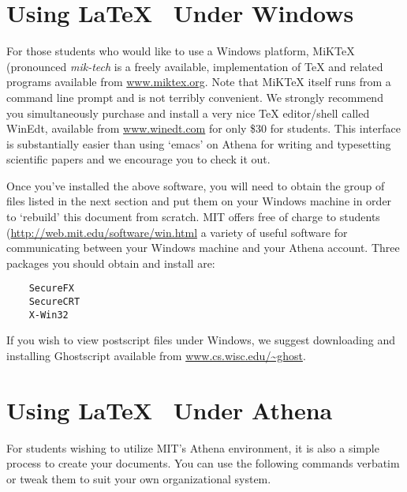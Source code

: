     \clearpage
    \appendix
    
    
    
    \section{Using \LaTeX~ Under Windows}
    For those students who would like to use a Windows platform, MiKTeX
    (pronounced \emph{mik-tech} is a freely available, implementation of
    TeX and related programs available from \url{www.miktex.org}. Note
    that MiKTeX itself runs from a command line prompt and is not terribly
    convenient.  We strongly recommend you simultaneously purchase and
    install a very nice TeX editor/shell called WinEdt, available from
    \url{www.winedt.com} for only \$30 for students. This interface is
    substantially easier than using `emacs' on Athena for writing and
    typesetting scientific papers and we encourage you to check it out.
    
    Once you've installed the above software, you will need to obtain the
    group of files listed in the next section and put them on your Windows
    machine in order to `rebuild' this document from scratch.  MIT offers
    free of charge to students (\url{http://web.mit.edu/software/win.html}
    a variety of useful software for communicating between your Windows
    machine and your Athena account.  Three packages you should obtain and
    install are:
    \begin{verbatim}
    SecureFX
    SecureCRT
    X-Win32
    \end{verbatim}
    
    If you wish to view postscript files under Windows, we
    suggest downloading and installing Ghostscript available from
    \url{www.cs.wisc.edu/~ghost}.
    
    
    
    
    
    \section{Using \LaTeX~ Under Athena}
    For students wishing to utilize MIT's Athena environment, it is also
    a simple process to create your documents.  You can use the following
    commands verbatim or tweak them to suit your own organizational system.
    
